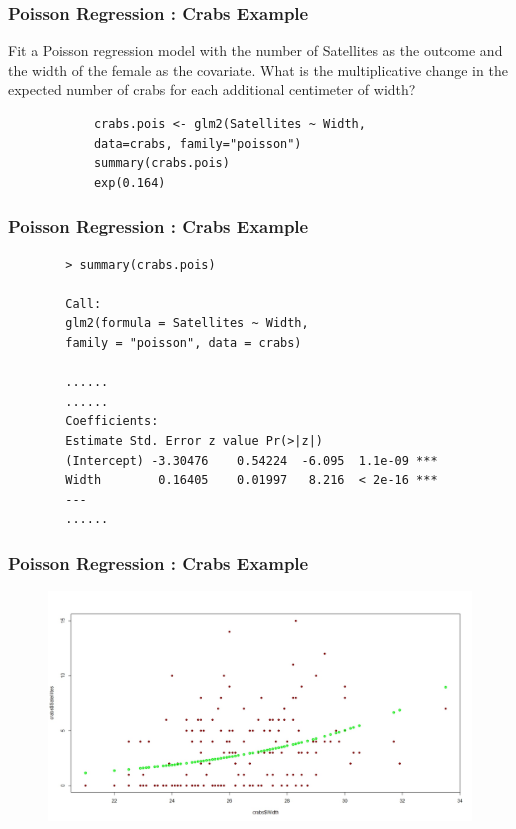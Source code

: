 \documentclass[MASTER.tex]{subfiles}
\begin{document}
	\begin{frame}[fragile]
		\frametitle{Poisson Regression :  Crabs Example}
		Fit a Poisson regression model with the number of Satellites as the outcome and the width of the female as the covariate. What is the multiplicative change in the expected number of crabs for each additional centimeter of width?
		\begin{framed}
			\begin{verbatim}
			crabs.pois <- glm2(Satellites ~ Width, 
			data=crabs, family="poisson")
			summary(crabs.pois)
			exp(0.164)
			\end{verbatim}
		\end{framed}
		
	\end{frame}
	\begin{frame}[fragile]
		\frametitle{Poisson Regression :  Crabs Example}
		\begin{verbatim}
		> summary(crabs.pois)
		
		Call:
		glm2(formula = Satellites ~ Width, 
		family = "poisson", data = crabs)
		
		...... 
		......
		Coefficients:
		Estimate Std. Error z value Pr(>|z|)    
		(Intercept) -3.30476    0.54224  -6.095  1.1e-09 ***
		Width        0.16405    0.01997   8.216  < 2e-16 ***
		---
		...... 
		\end{verbatim}
	
\end{frame}
\begin{frame}[fragile]
	\frametitle{Poisson Regression :  Crabs Example}
	\begin{figure}[h!]
		\centering
		\includegraphics[width=1.05\linewidth]{./DAquiz5Q3c}
	\end{figure}
\end{frame}
\end{document}
